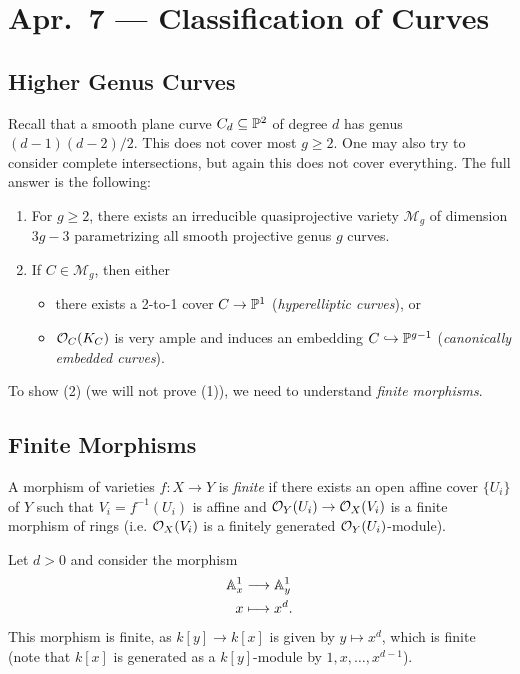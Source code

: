 \chapter{Apr.~7 --- Classification of Curves}

\section{Higher Genus Curves}

\begin{remark}
  Recall that a smooth plane curve
  $C_d \subseteq \mathbb{P}^2$ of
  degree $d$ has genus
  $(d - 1)(d - 2) / 2$. This does not cover
  most $g \ge 2$. One may also try to
  consider complete intersections, but again
  this does not cover everything.
  The full answer is the following:
  \begin{enumerate}
    \item For $g \ge 2$, there exists an
      irreducible quasiprojective variety
      $\mathcal{M}_g$
      of dimension $3g - 3$ parametrizing
      all smooth projective genus $g$ curves.
    \item If $C \in \mathcal{M}_g$,
      then either
      \begin{itemize}
        \item there exists a 2-to-1
          cover $C \to \mathbb{P}^1$
          (\emph{hyperelliptic curves}), or
        \item $\mathcal{O}_C(K_C)$
          is very ample and induces an
          embedding $C \hookrightarrow \mathbb{P}^{g - 1}$
          (\emph{canonically embedded curves}).
      \end{itemize}
  \end{enumerate}
  To show (2) (we will not prove (1)), we need
  to understand \emph{finite morphisms}.
\end{remark}

\section{Finite Morphisms}

\begin{definition}
  A morphism of varieties $f : X \to Y$ is
  \emph{finite} if there exists an open
  affine cover $\{U_i\}$ of $Y$ such that
  $V_i = f^{-1}(U_i)$ is affine and
  $\mathcal{O}_Y(U_i) \to \mathcal{O}_X(V_i)$ is a finite
  morphism of rings (i.e.
  $\mathcal{O}_X(V_i)$ is a finitely generated
  $\mathcal{O}_Y(U_i)$-module).
\end{definition}

\begin{example}
  Let $d > 0$ and consider the morphism
  \begin{align*}
    \mathbb{A}^1_x &\longrightarrow \mathbb{A}^1_y \\
    x &\longmapsto x^d.
  \end{align*}
  This morphism is finite, as
  $k[y] \to k[x]$ is given by $y \mapsto x^d$,
  which is finite
  (note that
  $k[x]$ is generated as a $k[y]$-module by
  $1, x, \dots, x^{d - 1}$).
\end{example}

